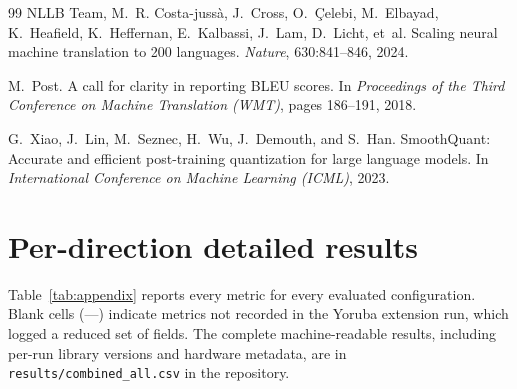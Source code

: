 \documentclass[11pt,a4paper]{article}
\begin{document}
\begin{thebibliography}{99}
NLLB Team, M.~R. Costa-juss{\`a}, J.~Cross, O.~{\c{C}}elebi, M.~Elbayad,
K.~Heafield, K.~Heffernan, E.~Kalbassi, J.~Lam, D.~Licht, et~al.
\newblock Scaling neural machine translation to 200 languages.
\newblock \emph{Nature}, 630:841--846, 2024.

M.~Post.
\newblock A call for clarity in reporting BLEU scores.
\newblock In \emph{Proceedings of the Third Conference on Machine
Translation (WMT)}, pages 186--191, 2018.

G.~Xiao, J.~Lin, M.~Seznec, H.~Wu, J.~Demouth, and S.~Han.
\newblock SmoothQuant: Accurate and efficient post-training
quantization for large language models.
\newblock In \emph{International Conference on Machine Learning
(ICML)}, 2023.

\end{thebibliography}

\appendix

\section{Per-direction detailed results}

Table~\ref{tab:appendix} reports every metric for every evaluated
configuration. Blank cells (---) indicate metrics not recorded in the
Yoruba extension run, which logged a reduced set of fields. The
complete machine-readable results, including per-run library versions
and hardware metadata, are in \texttt{results/combined\_all.csv} in the
repository.

{\scriptsize

}
\end{document}
